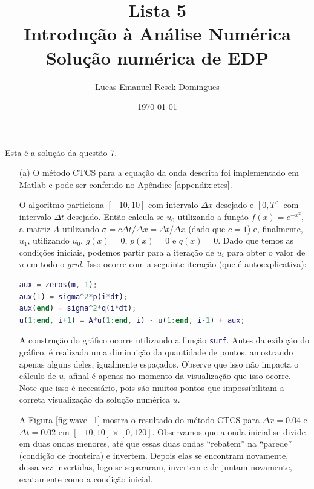 \documentclass{article}
\title{Lista 5 \\
\large Introdução à Análise Numérica \\
Solução numérica de EDP}
\author{Lucas Emanuel Resck Domingues}
\date{\today}
\begin{document}
    \maketitle

    Esta é a solução da questão 7.

    \begin{itemize}
        \item[(a)] O método CTCS para a equação da onda
            descrita foi implementado em Matlab e pode
            ser conferido no Apêndice \ref{appendix:ctcs}.

            O algoritmo particiona $[-10, 10]$ com intervalo
            $\Delta x$ desejado e $[0, T]$ com intervalo
            $\Delta t$ desejado. Então calcula-se $u_0$ utilizando a função
            $f(x) = e^{-x^2}$, a matriz $A$ utilizando
            $\sigma = c \Delta t / \Delta x = \Delta t / \Delta x$
            (dado que $c = 1$) e,
            finalmente, $u_1$, utilizando $u_0$, $g(x) = 0$, $p(x) = 0$
            e $q(x) = 0$. Dado que temos as condições iniciais,
            podemos partir para a iteração de $u_i$ para obter
            o valor de $u$ em todo o \textit{grid}. Isso ocorre com
            a seguinte iteração (que é autoexplicativa):

            \begin{lstlisting}[language=Matlab]
aux = zeros(m, 1);
aux(1) = sigma^2*p(i*dt);
aux(end) = sigma^2*q(i*dt);
u(1:end, i+1) = A*u(1:end, i) - u(1:end, i-1) + aux;
            \end{lstlisting}

            A construção do gráfico ocorre utilizando a função
            \lstinline[language=Matlab]{surf}. Antes da exibição do gráfico,
            é realizada uma diminuição da quantidade de pontos, amostrando
            apenas alguns deles, igualmente espaçados. Observe que isso
            não impacta o cálculo de $u$, afinal é apenas no momento da
            visualização que isso ocorre. Note que isso é necessário,
            pois são muitos pontos que impossibilitam a correta visualização
            da solução numérica $u$.

            A Figura \ref{fig:wave_1} mostra o resultado do método CTCS
            para $\Delta x = 0.04$ e $\Delta t = 0.02$ em
            $[-10, 10] \times [0, 120]$. Observamos que a onda inicial se divide
            em duas ondas menores, até que essas duas ondas ``rebatem'' na ``parede''
            (condição de fronteira) e invertem. Depois elas se encontram novamente,
            dessa vez invertidas, logo
            se separaram, invertem e de juntam novamente, exatamente como a condição
            inicial.


\end{itemize}
\end{document}
